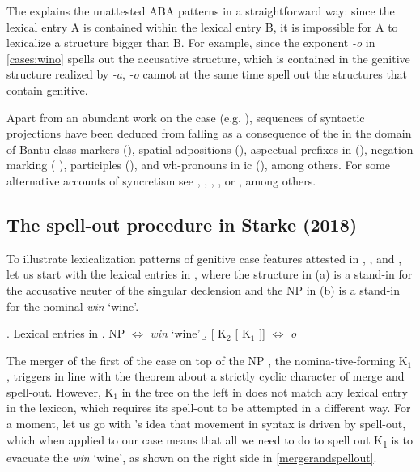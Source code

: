 \noindent
The  explains the unattested ABA patterns in a straightforward way: since the lexical entry A is contained within the lexical entry B, it is impossible for A to lexicalize a structure bigger than B. For example, since the exponent \textit{-o} in \ref{cases:wino} spells out the accusative structure, which is contained in the genitive structure realized by \textit{-a}, \textit{-o} cannot at the same time spell out the structures that contain genitive. 
\par 
Apart from an abundant work on the case  (e.g. \citealt{Caha2009,Zompi2017,Starke2017}), sequences of syntactic projections have been deduced from  falling as a consequence of the  in the domain of Bantu class markers (\citealt{Taraldsen2010}), spatial adpositions (\citealt{Pantcheva2011}), aspectual prefixes in  (\citealt{Wiland2012}), negation marking (\citeauthor{DeC2013} \citeyear{DeC2013,DeC2018}), participles (\citealt{Starke2006,LTN}), and wh-pronouns in ic (\citealt{Vangsnes2013}), among others. For some alternative accounts of syncretism see \cite{Stump2001}, \cite{Baerman2005}, \cite{Burzio2007}, \cite{Muller2008}, or \cite{Bobaljik2012}, among others. 

\subsection{The spell-out procedure in Starke (2018)}\label{sec:Starke2018}

  To illustrate lexicalization patterns of genitive case features attested in , , and , let us start with the lexical entries in \Next, where the structure in (a) is a stand-in for the  accusative neuter of the singular declension and the NP in (b) is a stand-in for the nominal  \textit{win} `wine'.

\ex. Lexical entries in 
\a. NP $\Leftrightarrow$ \textit{win} `wine'
\b. [ K$_{2}$ [ K$_{1}$ ]] $\Leftrightarrow$ \textit{o}\label{intro:o}

\noindent
The merger of the first  of the case  on top of the NP , the nomina-tive-forming K$_{1}$, triggers  in line with the theorem about a strictly cyclic character of merge and spell-out. However, K$_{1}$ in the tree on the left in \Next does not match any lexical entry in the  lexicon, which requires its spell-out to be attempted in a different way. For a moment, let us go  with \citeauthor{Caha2011}'s \citeyearpar{Caha2011} idea that movement in syntax is driven by spell-out, which when applied to our case means that all we need to do to spell out K\textsubscript{1} is to evacuate the  \textit{win} `wine', as shown on the right side in \ref{mergerandspellout}. 

